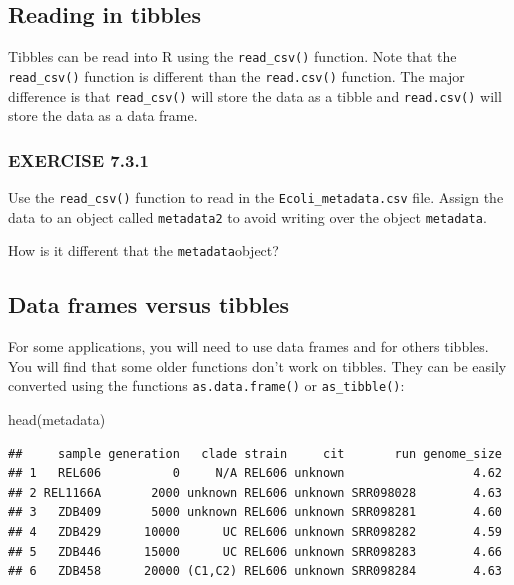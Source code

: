 \documentclass[
]{book}
\newenvironment{Shaded}{\begin{snugshade}}{\end{snugshade}}
\newcommand{\FunctionTok}[1]{\textcolor[rgb]{0.00,0.00,0.00}{#1}}
\newcommand{\NormalTok}[1]{#1}
\begin{document}
\hypertarget{reading-in-tibbles}{%
\subsection*{Reading in tibbles}\label{reading-in-tibbles}}

Tibbles can be read into R using the \texttt{read\_csv()} function. Note that the \texttt{read\_csv()} function is different than the \texttt{read.csv()} function. The major difference is that \texttt{read\_csv()} will store the data as a tibble and \texttt{read.csv()} will store the data as a data frame.

\hypertarget{exercise-7.3.1}{%
\subsubsection*{EXERCISE 7.3.1}\label{exercise-7.3.1}}

Use the \texttt{read\_csv()} function to read in the \texttt{Ecoli\_metadata.csv} file. Assign the data to an object called \texttt{metadata2} to avoid writing over the object \texttt{metadata}.

How is it different that the \texttt{metadata}object?

\hypertarget{data-frames-versus-tibbles}{%
\subsection*{Data frames versus tibbles}\label{data-frames-versus-tibbles}}

For some applications, you will need to use data frames and for others tibbles. You will find that some older functions don't work on tibbles. They can be easily converted using the functions \texttt{as.data.frame()} or \texttt{as\_tibble()}:

\begin{Shaded}
\begin{Highlighting}[]
\FunctionTok{head}\NormalTok{(metadata)}
\end{Highlighting}
\end{Shaded}

\begin{verbatim}
##     sample generation   clade strain     cit       run genome_size
## 1   REL606          0     N/A REL606 unknown                  4.62
## 2 REL1166A       2000 unknown REL606 unknown SRR098028        4.63
## 3   ZDB409       5000 unknown REL606 unknown SRR098281        4.60
## 4   ZDB429      10000      UC REL606 unknown SRR098282        4.59
## 5   ZDB446      15000      UC REL606 unknown SRR098283        4.66
## 6   ZDB458      20000 (C1,C2) REL606 unknown SRR098284        4.63
\end{verbatim}
\end{document}
